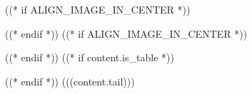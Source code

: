 ((* if ALIGN_IMAGE_IN_CENTER *))\begin{center}((* endif *))
((* if ALIGN_IMAGE_IN_CENTER *))\end{center}((* endif *))
((* if content.is_table *))\par\vspace{-5pt}((* endif *))
(((content.tail)))
